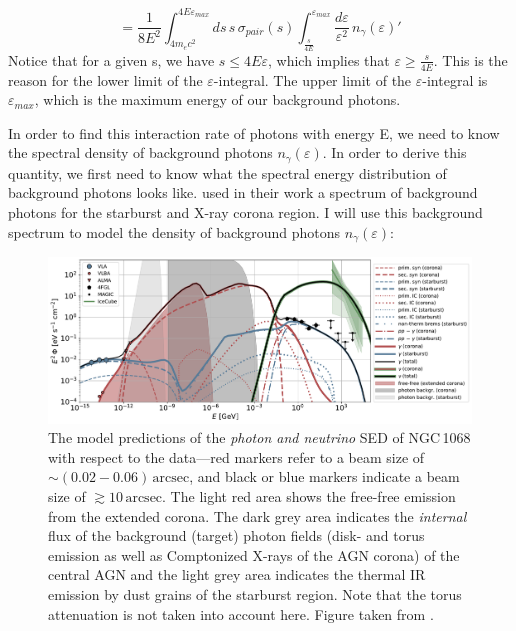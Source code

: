 \begin{equation}
    =  \frac{1}{8E^2}\int_{4m_ec^2}^{4E\varepsilon_{max}}ds\,s\,\sigma_{pair}(s)\int_{\frac{s}{4E}}^{\varepsilon_{max}}\frac{d\varepsilon}{\varepsilon^2}\,n_{\gamma}(\varepsilon)'
    \label{eq:interaction_rate_third_one}
\end{equation}
Notice that for a given s, we have $s \leq 4E\varepsilon$, which implies that $\varepsilon \geq \frac{s}{4E}$. This is the reason for the lower limit of the $\varepsilon$-integral. The upper limit of the $\varepsilon$-integral is $\varepsilon_{max}$, which is the maximum energy of our background photons.

In order to find this interaction rate of photons with energy E, we need to know the spectral density of background photons $n_{\gamma}(\varepsilon)$. In order to derive this quantity, we first need to know what the spectral energy distribution of background photons looks like. \citet{Eichmann_2022} used in their work a spectrum of background photons for the starburst and X-ray corona region. I will use this background spectrum to model the density of background photons $n_{\gamma}(\varepsilon)$:


\begin{figure}[H]
    \includegraphics[width=\textwidth]{Figures/fit5b2_SED_details.pdf}
    \centering
    \caption{The model predictions of the \emph{photon and neutrino} SED of NGC\,1068 with respect to the data---red markers refer to a beam size of $\sim (0.02-0.06)\,\text{arcsec}$, and black or blue markers indicate a beam size of $\gtrsim 10\,\text{arcsec}$. The light red area shows the free-free emission from the extended corona. The dark grey area indicates the \emph{internal} flux of the background (target) photon fields (disk- and torus emission as well as Comptonized X-rays of the AGN corona) of the central AGN and the light grey area indicates the thermal IR emission by dust grains of the starburst region. Note that the torus attenuation is not taken into account here. Figure taken from \citet{Eichmann_2022}.} 
    \label{fig:background_spectral_density}
\end{figure}

